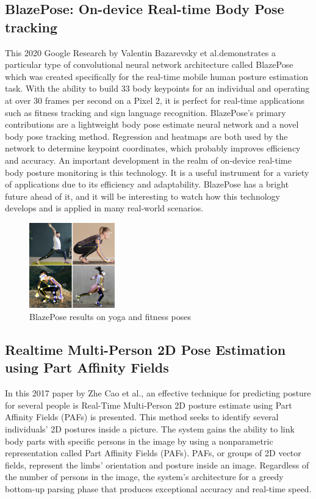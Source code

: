 \documentclass[runningheads]{llncs}
\begin{document}
    \subsection{BlazePose: On-device Real-time Body Pose tracking \parencite{bazarevsky2020blazeposeondevicerealtimebody}}
        This 2020 Google Research by Valentin Bazarevsky et al.\@ demonstrates a particular type of convolutional neural network architecture called BlazePose which was created specifically for the real-time mobile human posture estimation task. 
        With the ability to build 33 body keypoints for an individual and operating at over 30 frames per second on a Pixel 2, it is perfect for real-time applications such as fitness tracking and sign language recognition. BlazePose's primary contributions are a lightweight body pose estimate neural network and a novel body pose tracking method. 
        Regression and heatmaps are both used by the network to determine keypoint coordinates, which probably improves efficiency and accuracy. An important development in the realm of on-device real-time body posture monitoring is this technology. It is a useful instrument for a variety of applications due to its efficiency and adaptability. BlazePose has a bright future ahead of it, and it will be interesting to watch how this technology develops and is applied in many real-world scenarios.
        \begin{figure}[htbp]
            \centering
            \includegraphics[width=0.33\textwidth]{figures/BlazePose.png}
            \caption{BlazePose results on yoga and fitness poses}
        \end{figure}

    \subsection{Realtime Multi-Person 2D Pose Estimation using Part Affinity Fields \parencite{cao2017realtimemultiperson2dpose}}
        In this 2017 paper by Zhe Cao et al., an effective technique for predicting posture for several people is Real-Time Multi-Person 2D posture estimate using Part Affinity Fields (PAFs) is presented. This method seeks to identify several individuals' 2D postures inside a picture. The system gains the ability to link body parts with specific persons in the image by using a nonparametric representation called Part Affinity Fields (PAFs). PAFs, or groups of 2D vector fields, represent the limbs' orientation and posture inside an image. Regardless of the number of persons in the image, the system's architecture for a greedy bottom-up parsing phase that produces exceptional accuracy and real-time speed.\\
\end{document}
